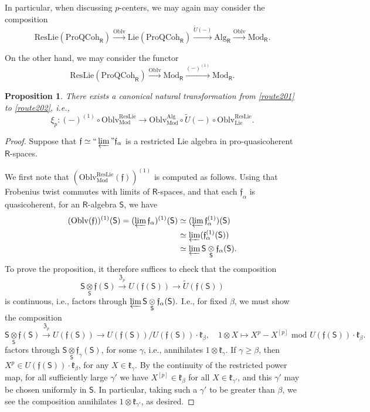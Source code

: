 \documentclass{amsart}
\newtheorem{Prop}[Thm]{Proposition}
\theoremstyle{definition}
\newcommand{\fk}{\mathfrak{k}}
\newcommand{\Oblv}{\on{Oblv}}
\newcommand{\Pro}{\on{Pro}}
\newcommand{\fr}{^\on{(1)}}
\newcommand{\Sing}{\mathsf{S}}
\newcommand{\QCoh}{\on{QCoh}}
\newcommand{\on}{\mathrm}
\newcommand{\Ring}{\mathsf{R}}
\newcommand{\ff}{\mathfrak{f}}
\newcommand{\fZ}{\mathfrak{Z}}
\numberwithin{equation}{section}
\begin{document}
In particular, when discussing $p$-centers, we may again may consider the composition
\begin{equation} \label{route202} \on{ResLie}(\Pro\QCoh_\Ring) \xrightarrow{\on{Oblv}} \on{Lie}(\Pro\QCoh_\Ring) \xrightarrow{\widetilde{U}(-)} \on{Alg}_\Ring \xrightarrow{\Oblv} \on{Mod}_\Ring. \end{equation}

On the other hand, we may consider the functor
\begin{equation} \label{route201}\on{ResLie}(\Pro\QCoh_\Ring) \xrightarrow{\Oblv} \on{Mod}_\Ring \xrightarrow{(-)\fr} \on{Mod}_\Ring. \end{equation}

\begin{Prop} \label{p:pcenpro}There exists a canonical natural transformation from \eqref{route201} to \eqref{route202}, i.e., 
$$\xi_p: (-)\fr \circ \on{Oblv}^{\on{ResLie}}_{\on{Mod}} \rightarrow \on{Oblv}^{\on{Alg}}_{\on{Mod}} \circ \widetilde{U}(-) \circ \on{Oblv}^{\on{ResLie}}_{\on{Lie}}.$$  
\end{Prop}


\begin{proof} Suppose that $\ff \simeq ``\varprojlim" \ff_\alpha$ is a restricted Lie algebra in pro-quasicoherent $\Ring$-spaces. 

We first note that $(\on{Oblv}^{\on{ResLie}}_{\on{Mod}}(\ff))\fr$ is computed as follows. Using that Frobenius twist commutes with limits of $\Ring$-spaces, and that each $\ff_\alpha$ is quasicoherent, for an $\Ring$-algebra $\Sing$, we have
\begin{align*}
  (\on{Oblv}(\ff))\fr(\Sing)  = (\varprojlim \ff_\alpha)\fr(\Sing) & \simeq (\varprojlim \ff_\alpha\fr)(\Sing) \\ & \simeq \varprojlim (\ff_\alpha\fr(\Sing)) \\ & \simeq \varprojlim \Sing \underset{\Sing} \otimes \ff_\alpha(\Sing).
\end{align*}
To prove the proposition, it therefore suffices to check that the composition
$$\Sing \underset{\Sing} \otimes \ff(\Sing) \xrightarrow{\fZ_p} U(\ff(\Sing)) \rightarrow \widetilde{U}(\ff(\Sing))$$
is continuous, i.e., factors through $\varprojlim \Sing \underset{\Sing} \otimes \ff_\alpha(\Sing).$ I.e., for fixed $\beta$, we must show the composition
$$\Sing \underset{\Sing} \otimes \ff(\Sing) \xrightarrow{\fZ_p} U(\ff(\Sing)) \rightarrow U(\ff(\Sing)) / U(\ff(\Sing)) \cdot \fk_\beta,  \quad 1 \otimes X \mapsto X^p - X^{[p]} \text{ mod } U(\ff(\Sing)) \cdot \fk_\beta.$$
factors through $\Sing \underset{\Sing} \otimes \ff_\gamma(\Sing)$, for some $\gamma$, i.e., annihilates  $1 \otimes \fk_\gamma$. If $\gamma \geqslant \beta$, then $X^p \in U(\ff(\Sing)) \cdot \fk_\beta$, for any $X \in \fk_\gamma$. By the continuity of the restricted power map, for all sufficiently large $\gamma'$ we have $X^{[p]} \in \fk_{\beta}$ for all $X \in \fk_{\gamma'}$, and this $\gamma'$ may be chosen uniformly in $\Sing$. In particular, taking such a $\gamma'$ to be greater than $\beta$, we see the composition annihilates $1 \otimes \fk_{\gamma'}$, as desired. 
\end{proof}
\end{document}
